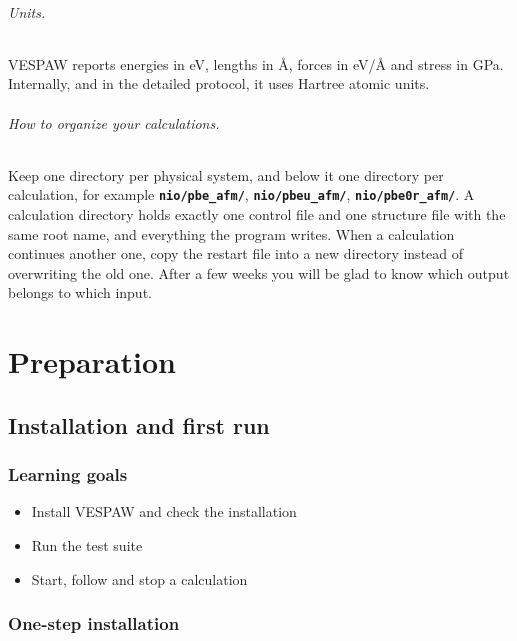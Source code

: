 \documentclass[11pt,a4paper,oneside]{book}
\newcommand{\file}[1]{\textbf{\texttt{#1}}}
\newcommand{\goals}{\section{Learning goals}}
\begin{document}
\paragraph{Units.} VESPAW reports energies in eV, lengths in \AA,
forces in eV/\AA{} and stress in GPa. Internally, and in the detailed
protocol, it uses Hartree atomic units.

\paragraph{How to organize your calculations.} Keep one directory per
physical system, and below it one directory per calculation, for
example \file{nio/pbe\_afm/}, \file{nio/pbeu\_afm/},
\file{nio/pbe0r\_afm/}. A calculation directory holds exactly one
control file and one structure file with the same root name, and
everything the program writes. When a calculation continues another
one, copy the restart file into a new directory instead of overwriting
the old one. After a few weeks you will be glad to know which output
belongs to which input.

\part{Preparation}

\chapter{Installation and first run}
\minitoc

\goals
\begin{itemize}
\item Install VESPAW and check the installation
\item Run the test suite
\item Start, follow and stop a calculation
\end{itemize}

\section{One-step installation}
\end{document}
